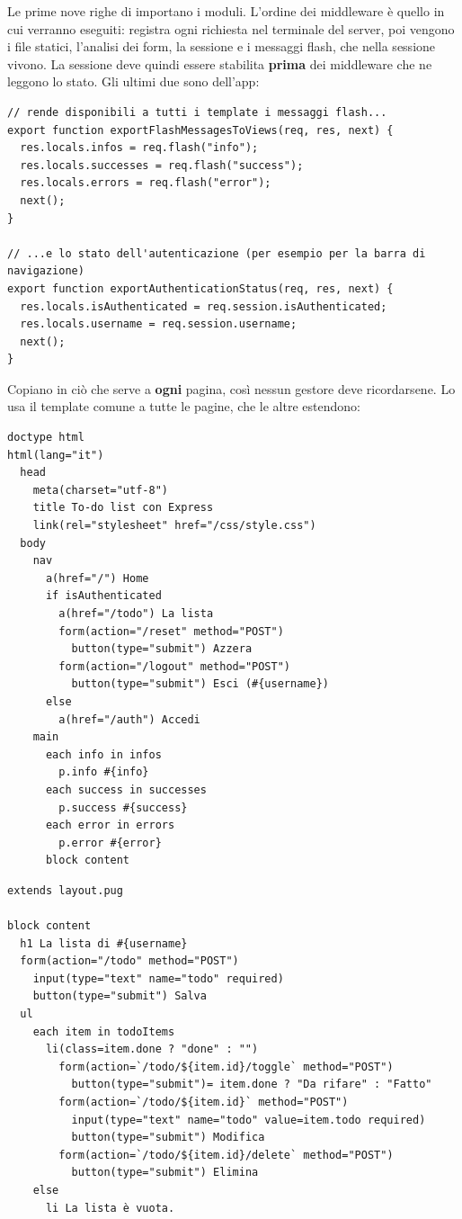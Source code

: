 Le prime nove righe di  importano i moduli. L'ordine dei
middleware è quello in cui verranno eseguiti:  registra ogni
richiesta nel terminale del server, poi vengono i file statici, l'analisi dei
form, la sessione e i messaggi flash, che nella sessione vivono. La sessione
deve quindi essere stabilita \textbf{prima} dei middleware che ne leggono lo
stato. Gli ultimi due sono dell'app:

\begin{lstlisting}[style=js, name=middleware/views.js]
// rende disponibili a tutti i template i messaggi flash...
export function exportFlashMessagesToViews(req, res, next) {
  res.locals.infos = req.flash("info");
  res.locals.successes = req.flash("success");
  res.locals.errors = req.flash("error");
  next();
}

// ...e lo stato dell'autenticazione (per esempio per la barra di navigazione)
export function exportAuthenticationStatus(req, res, next) {
  res.locals.isAuthenticated = req.session.isAuthenticated;
  res.locals.username = req.session.username;
  next();
}
\end{lstlisting}

Copiano in  ciò che serve a \textbf{ogni} pagina, così nessun
gestore deve ricordarsene. Lo usa il template comune a tutte le pagine, che le
altre estendono:

\begin{affianco}[0.41][t]
\codicepiccolo
\begin{lstlisting}[style=pug, name=views/layout.pug]
doctype html
html(lang="it")
  head
    meta(charset="utf-8")
    title To-do list con Express
    link(rel="stylesheet" href="/css/style.css")
  body
    nav
      a(href="/") Home
      if isAuthenticated
        a(href="/todo") La lista
        form(action="/reset" method="POST")
          button(type="submit") Azzera
        form(action="/logout" method="POST")
          button(type="submit") Esci (#{username})
      else
        a(href="/auth") Accedi
    main
      each info in infos
        p.info #{info}
      each success in successes
        p.success #{success}
      each error in errors
        p.error #{error}
      block content
\end{lstlisting}
\risultato
\codicepiccolo
\begin{lstlisting}[style=pug, name=views/todo.pug]
extends layout.pug

block content
  h1 La lista di #{username}
  form(action="/todo" method="POST")
    input(type="text" name="todo" required)
    button(type="submit") Salva
  ul
    each item in todoItems
      li(class=item.done ? "done" : "")
        form(action=`/todo/${item.id}/toggle` method="POST")
          button(type="submit")= item.done ? "Da rifare" : "Fatto"
        form(action=`/todo/${item.id}` method="POST")
          input(type="text" name="todo" value=item.todo required)
          button(type="submit") Modifica
        form(action=`/todo/${item.id}/delete` method="POST")
          button(type="submit") Elimina
    else
      li La lista è vuota.
\end{lstlisting}
\end{affianco}


